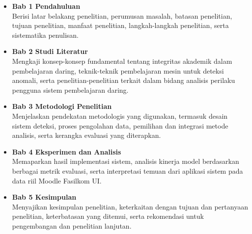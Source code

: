\begin{itemize}
\item \textbf{Bab 1 Pendahuluan}\\
Berisi latar belakang penelitian, perumusan masalah, batasan penelitian, tujuan penelitian, manfaat penelitian, langkah-langkah penelitian, serta sistematika penulisan.

\item \textbf{Bab 2 Studi Literatur}\\
Mengkaji konsep-konsep fundamental tentang integritas akademik dalam pembelajaran daring, teknik-teknik pembelajaran mesin untuk deteksi anomali, serta penelitian-penelitian terkait dalam bidang analisis perilaku pengguna sistem pembelajaran daring.

\item \textbf{Bab 3 Metodologi Penelitian}\\
Menjelaskan pendekatan metodologis yang digunakan, termasuk desain sistem deteksi, proses pengolahan data, pemilihan dan integrasi metode analisis, serta kerangka evaluasi yang diterapkan.

\item \textbf{Bab 4 Eksperimen dan Analisis}\\
Memaparkan hasil implementasi sistem, analisis kinerja model berdasarkan berbagai metrik evaluasi, serta interpretasi temuan dari aplikasi sistem pada data riil Moodle Fasilkom UI.

\item \textbf{Bab 5 Kesimpulan}\\
Menyajikan kesimpulan penelitian, keterkaitan dengan tujuan dan pertanyaan penelitian, keterbatasan yang ditemui, serta rekomendasi untuk pengembangan dan penelitian lanjutan.
\end{itemize}

